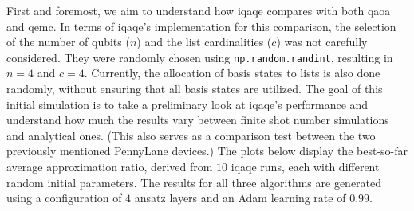 First and foremost, we aim to understand how \acrshort{iqaqe} compares with both \acrshort{qaoa} and \acrshort{qemc}. In terms of \acrshort{iqaqe}'s implementation for this comparison, the selection of the number of qubits ($n$) and the list cardinalities ($c$) was not carefully considered. They were randomly chosen using \texttt{np.random.randint}, resulting in $n = 4$ and $c = 4$. Currently, the allocation of basis states to lists is also done randomly, without ensuring that all basis states are utilized. The goal of this initial simulation is to take a preliminary look at \acrshort{iqaqe}'s performance and understand how much the results vary between finite shot number simulations and analytical ones. (This also serves as a comparison test between the two previously mentioned PennyLane devices.) The plots below display the best-so-far average approximation ratio, derived from $10$ \acrshort{iqaqe} runs, each with different random initial parameters. The results for all three algorithms are generated using a configuration of $4$ ansatz layers and an Adam learning rate of $0.99$.


